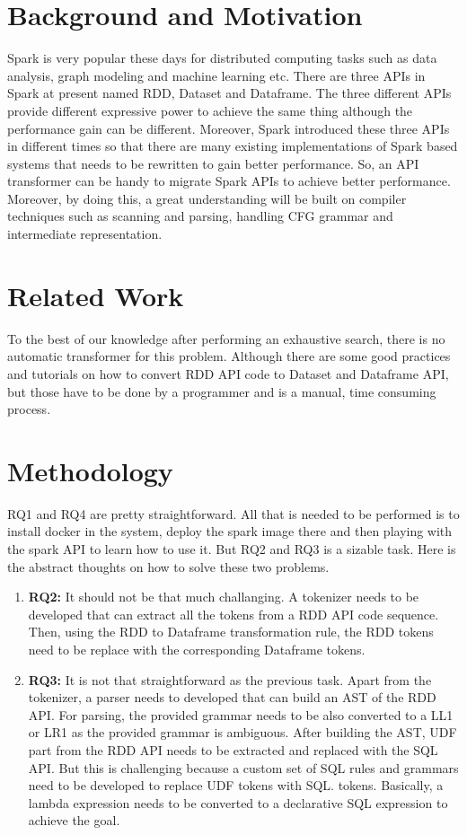 \documentclass[sigplan]{acmart}\settopmatter{printfolios=true,printccs=false,printacmref=false}
\begin{document}
\section{Background and Motivation}
Spark is very popular these days for distributed computing tasks such as data analysis, graph modeling and machine learning etc. There are three APIs in Spark at present named RDD, Dataset and Dataframe. The three different APIs provide different expressive power to achieve the same thing although the performance gain can be different. Moreover, Spark introduced these three APIs in different times so that there are many existing implementations of Spark based systems that needs to be rewritten to gain better performance. So, an API transformer can be handy to migrate Spark APIs to achieve better performance. Moreover, by doing this, a great understanding will be built on compiler techniques such as scanning and parsing, handling CFG grammar and intermediate representation.  

\section{Related Work}
To the best of our knowledge after performing an exhaustive search, there is no automatic transformer for this problem. Although there are some good practices and tutorials on how to convert RDD API code to Dataset and Dataframe API, but those have to be done by a programmer and is a manual, time consuming process. 

\section{Methodology}
RQ1 and RQ4 are pretty straightforward. All that is needed to be performed is to install docker in the system, deploy the spark image there and then playing with the spark API to learn how to use it. But RQ2 and RQ3 is a sizable task. Here is the abstract thoughts on how to solve these two problems. 

\begin{enumerate}
	\item \textbf{RQ2:} It should not be that much challanging. A tokenizer needs to be developed that can extract all the tokens from a RDD API code sequence. Then, using the RDD to Dataframe transformation rule, the RDD tokens need to be replace with the corresponding Dataframe tokens.
	\item \textbf{RQ3:} It is not that straightforward as the previous task. Apart from the tokenizer, a parser needs to developed that can build an AST of the RDD API. For parsing, the provided grammar needs to be also converted to a LL1 or LR1 as the provided grammar is ambiguous. After building the AST, UDF part from the RDD API needs to be extracted and replaced with the SQL API. But this is challenging because a custom set of SQL rules and grammars need to be developed to replace UDF tokens with SQL. tokens. Basically, a lambda expression needs to be converted to a declarative SQL expression to achieve the goal. 
\end{enumerate}  
\end{document}
